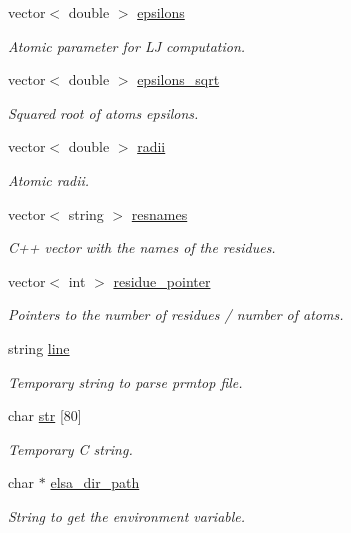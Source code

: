 \begin{DoxyCompactItemize}
vector$<$ double $>$ \hyperlink{classMol2_adcc95358a2c491ac6a14a30044787472}{epsilons}
\begin{DoxyCompactList}\small\item\em Atomic parameter for LJ computation. \end{DoxyCompactList}\item 
vector$<$ double $>$ \hyperlink{classMol2_ae70f58cb375c447b9ec696083ee9eef8}{epsilons\_\-sqrt}
\begin{DoxyCompactList}\small\item\em Squared root of atoms epsilons. \end{DoxyCompactList}\item 
vector$<$ double $>$ \hyperlink{classMol2_a7b15edd05ff72f2d22479ad8f4d1429a}{radii}
\begin{DoxyCompactList}\small\item\em Atomic radii. \end{DoxyCompactList}\item 
vector$<$ string $>$ \hyperlink{classMol2_ae90bc79def72332bc0673ad31ad73fdd}{resnames}
\begin{DoxyCompactList}\small\item\em C++ vector with the names of the residues. \end{DoxyCompactList}\item 
vector$<$ int $>$ \hyperlink{classMol2_af422c05d5d408a1b5d64522532ace2d3}{residue\_\-pointer}
\begin{DoxyCompactList}\small\item\em Pointers to the number of residues / number of atoms. \end{DoxyCompactList}\item 
string \hyperlink{classMol2_a67ceb39981358eff84552a6eefa21065}{line}
\begin{DoxyCompactList}\small\item\em Temporary string to parse prmtop file. \end{DoxyCompactList}\item 
char \hyperlink{classMol2_a6041f89cb497b7bd329a7d2de0bdd164}{str} \mbox{[}80\mbox{]}
\begin{DoxyCompactList}\small\item\em Temporary C string. \end{DoxyCompactList}\item 
char $\ast$ \hyperlink{classMol2_ab7f7de6a9bd8dc025659a9db852943ba}{elsa\_\-dir\_\-path}
\begin{DoxyCompactList}\small\item\em String to get the environment variable. \end{DoxyCompactList}\item 

\end{DoxyCompactItemize}
